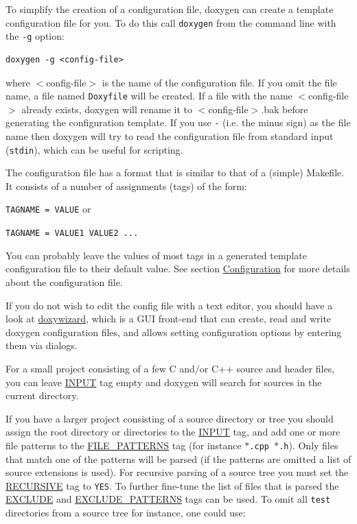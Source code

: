 To simplify the creation of a configuration file, doxygen can create a template configuration file for you. To do this call {\tt doxygen} from the command line with the {\tt -g} option: 

\footnotesize\begin{verbatim}
doxygen -g <config-file>
\end{verbatim}
\normalsize


where $<$config-file$>$ is the name of the configuration file. If you omit the file name, a file named {\tt Doxyfile} will be created. If a file with the name $<$config-file$>$ already exists, doxygen will rename it to $<$config-file$>$.bak before generating the configuration template. If you use {\tt -} (i.e. the minus sign) as the file name then doxygen will try to read the configuration file from standard input ({\tt stdin}), which can be useful for scripting.

The configuration file has a format that is similar to that of a (simple) Makefile. It consists of a number of assignments (tags) of the form:

{\tt TAGNAME = VALUE} or \par
 {\tt TAGNAME = VALUE1 VALUE2 ... }\par


You can probably leave the values of most tags in a generated template configuration file to their default value. See section \hyperlink{config}{Configuration} for more details about the configuration file.

If you do not wish to edit the config file with a text editor, you should have a look at \hyperlink{doxywizard_usage}{doxywizard}, which is a GUI front-end that can create, read and write doxygen configuration files, and allows setting configuration options by entering them via dialogs.

For a small project consisting of a few C and/or C++ source and header files, you can leave \hyperlink{config_cfg_input}{INPUT} tag empty and doxygen will search for sources in the current directory.

If you have a larger project consisting of a source directory or tree you should assign the root directory or directories to the \hyperlink{config_cfg_input}{INPUT} tag, and add one or more file patterns to the \hyperlink{config_cfg_file_patterns}{FILE\_\-PATTERNS} tag (for instance {\tt $\ast$.cpp $\ast$.h}). Only files that match one of the patterns will be parsed (if the patterns are omitted a list of source extensions is used). For recursive parsing of a source tree you must set the \hyperlink{config_cfg_recursive}{RECURSIVE} tag to {\tt YES}. To further fine-tune the list of files that is parsed the \hyperlink{config_cfg_exclude}{EXCLUDE} and \hyperlink{config_cfg_exclude_patterns}{EXCLUDE\_\-PATTERNS} tags can be used. To omit all {\tt test} directories from a source tree for instance, one could use: 

